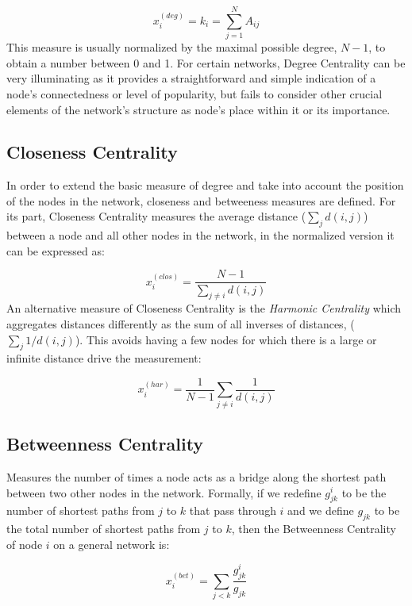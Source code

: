 \begin{equation}
    x_i^{(deg)}=k_i=\sum_{j=1}^{N}A_{ij}
\end{equation}
This measure is usually normalized by the maximal possible degree, $N − 1$, to obtain a number between 0 and 1. For certain networks, Degree Centrality can be very illuminating as it provides a straightforward and simple indication of a node's connectedness or level of popularity, but fails to consider other crucial elements of the network's structure as node's place within it or its importance.

\subsection*{Closeness Centrality} In order to extend the basic measure of degree and take into account the position of the nodes in the network, closeness and betweeness measures are defined. For its part, Closeness Centrality measures the average distance ($\sum_{j}^{}d(i,j)$) between a node and all other nodes in the network, in the normalized version it can be expressed as:

\begin{equation}
    x_i^{(clos)}= \frac{N-1}{\sum_{j\ne i}^{}d(i,j)}
\end{equation}
An alternative measure of Closeness Centrality is the \textit{Harmonic Centrality} which aggregates distances differently as the sum of all inverses
of distances, ($\sum_{j}^{}1/d(i,j)$). This avoids having a few nodes for which there is a large or infinite distance drive the measurement:

\begin{equation}
    x_i^{(har)}= \frac{1}{N-1}\sum_{j\ne i}^{}\frac{1}{d(i,j)}
\end{equation}

\subsection*{Betweenness Centrality} Measures the number of times a node acts as a bridge along the shortest path between two other nodes in the network. Formally, if we redefine $g_{jk}^i$ to be the number of shortest paths from $j$ to $k$ that pass through $i$ and we define $g_{jk}$ to be the total number of shortest paths from $j$ to $k$, then the Betweenness Centrality of node $i$ on a general network is:

\begin{equation}
    x_i^{(bet)}= \sum_{j<k}^{}\frac{g_{jk}^i}{g_{jk}}
\end{equation}

